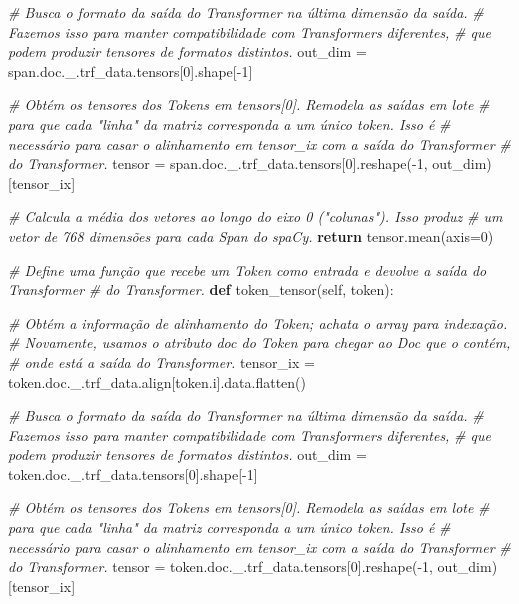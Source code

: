 \documentclass[
  brazilian,
]{article}
\newenvironment{Shaded}{}{}
\newcommand{\CommentTok}[1]{\textcolor[rgb]{0.38,0.63,0.69}{\textit{#1}}}
\newcommand{\ControlFlowTok}[1]{\textcolor[rgb]{0.00,0.44,0.13}{\textbf{#1}}}
\newcommand{\DecValTok}[1]{\textcolor[rgb]{0.25,0.63,0.44}{#1}}
\newcommand{\KeywordTok}[1]{\textcolor[rgb]{0.00,0.44,0.13}{\textbf{#1}}}
\newcommand{\NormalTok}[1]{#1}
\newcommand{\OperatorTok}[1]{\textcolor[rgb]{0.40,0.40,0.40}{#1}}
\newcommand{\VariableTok}[1]{\textcolor[rgb]{0.10,0.09,0.49}{#1}}
\begin{document}
\begin{Shaded}
\begin{Highlighting}[]
        \CommentTok{\# Busca o formato da saída do Transformer na última dimensão da saída.}
        \CommentTok{\# Fazemos isso para manter compatibilidade com Transformers diferentes,}
        \CommentTok{\# que podem produzir tensores de formatos distintos.}
\NormalTok{        out\_dim }\OperatorTok{=}\NormalTok{ span.doc.\_.trf\_data.tensors[}\DecValTok{0}\NormalTok{].shape[}\OperatorTok{{-}}\DecValTok{1}\NormalTok{]}
        
        \CommentTok{\# Obtém os tensores dos Tokens em tensors[0]. Remodela as saídas em lote}
        \CommentTok{\# para que cada "linha" da matriz corresponda a um único token. Isso é}
        \CommentTok{\# necessário para casar o alinhamento em \textquotesingle{}tensor\_ix\textquotesingle{} com a saída do Transformer}
        \CommentTok{\# do Transformer.}
\NormalTok{        tensor }\OperatorTok{=}\NormalTok{ span.doc.\_.trf\_data.tensors[}\DecValTok{0}\NormalTok{].reshape(}\OperatorTok{{-}}\DecValTok{1}\NormalTok{, out\_dim)[tensor\_ix]}
        
        \CommentTok{\# Calcula a média dos vetores ao longo do eixo 0 ("colunas"). Isso produz}
        \CommentTok{\# um vetor de 768 dimensões para cada Span do spaCy.}
        \ControlFlowTok{return}\NormalTok{ tensor.mean(axis}\OperatorTok{=}\DecValTok{0}\NormalTok{)}
    
    \CommentTok{\# Define uma função que recebe um Token como entrada e devolve a saída do Transformer}
    \CommentTok{\# do Transformer.}
    \KeywordTok{def}\NormalTok{ token\_tensor(}\VariableTok{self}\NormalTok{, token):}
        
        \CommentTok{\# Obtém a informação de alinhamento do Token; achata o array para indexação.}
        \CommentTok{\# Novamente, usamos o atributo \textquotesingle{}doc\textquotesingle{} do Token para chegar ao Doc que o contém,}
        \CommentTok{\# onde está a saída do Transformer.}
\NormalTok{        tensor\_ix }\OperatorTok{=}\NormalTok{ token.doc.\_.trf\_data.align[token.i].data.flatten()}
        
        \CommentTok{\# Busca o formato da saída do Transformer na última dimensão da saída.}
        \CommentTok{\# Fazemos isso para manter compatibilidade com Transformers diferentes,}
        \CommentTok{\# que podem produzir tensores de formatos distintos.}
\NormalTok{        out\_dim }\OperatorTok{=}\NormalTok{ token.doc.\_.trf\_data.tensors[}\DecValTok{0}\NormalTok{].shape[}\OperatorTok{{-}}\DecValTok{1}\NormalTok{]}
        
        \CommentTok{\# Obtém os tensores dos Tokens em tensors[0]. Remodela as saídas em lote}
        \CommentTok{\# para que cada "linha" da matriz corresponda a um único token. Isso é}
        \CommentTok{\# necessário para casar o alinhamento em \textquotesingle{}tensor\_ix\textquotesingle{} com a saída do Transformer}
        \CommentTok{\# do Transformer.}
\NormalTok{        tensor }\OperatorTok{=}\NormalTok{ token.doc.\_.trf\_data.tensors[}\DecValTok{0}\NormalTok{].reshape(}\OperatorTok{{-}}\DecValTok{1}\NormalTok{, out\_dim)[tensor\_ix]}


\end{Highlighting}
\end{Shaded}
\end{document}
